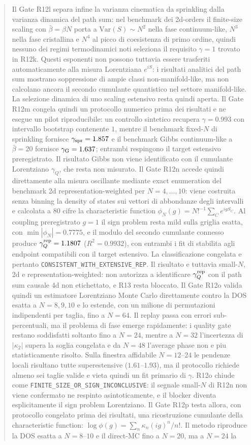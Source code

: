 \documentclass[11pt,a4paper]{article}
\begin{document}
\begin{abstract}
 Il Gate R12l separa infine la varianza cinematica da sprinkling dalla varianza dinamica del path sum: nel benchmark dei 2d-orders il finite-size scaling con $\bar\beta=\beta N$ porta a $\mathrm{Var}(S)\sim N^2$ nella fase continuum-like, $N^3$ nella fase cristallina e $N^4$ al picco di coesistenza di primo ordine, quindi nessuno dei regimi termodinamici noti seleziona il requisito $\gamma=1$ trovato in R12k. Questi esponenti non possono tuttavia essere trasferiti automaticamente alla misura Lorentziana $e^{iS}$: i risultati analitici del path sum mostrano soppressione di ampie classi non-manifold-like, ma non calcolano ancora il secondo cumulante quantistico nel settore manifold-like. La selezione dinamica di uno scaling estensivo resta quindi aperta. Il Gate R12m congela quindi un protocollo numerico prima dei risultati e ne esegue un pilot riproducibile: un controllo sintetico recupera $\gamma=0.993$ con intervallo bootstrap contenente $1$, mentre il benchmark fixed-$N$ di sprinkling fornisce $\gamma_{\rm spr}=1.857$ e il benchmark Gibbs continuum-like a $\bar\beta=20$ fornisce $\gamma_{\rm G}=1.637$; entrambi respingono il target estensivo preregistrato. Il risultato Gibbs non viene identificato con il cumulante Lorentziano $\gamma_Q$, che resta non misurato. Il Gate R12n accede quindi direttamente alla misura oscillante mediante exact enumeration del benchmark 2d representation-weighted per $N=4,\ldots,10$: viene costruita senza binning la density of states sui vettori di abbondanze degli intervalli e calcolata a 80 cifre la characteristic function $\phi_N(g)=N!^{-1}\sum_C e^{igS_C}$. Al coupling preregistrato $g=1$ il sign problem resta mild sulla griglia esatta, con $\min|\phi_N|=0.7775$, e il modulo del secondo cumulante connesso produce $\gamma_Q^{\rm rep}=1.1807$ ($R^2=0.9932$), con entrambi i fit di stabilita agli endpoint compatibili con il target estensivo. La classificazione congelata e pertanto \texttt{CONSISTENT\_WITH\_EXTENSIVE\_REP}. Il risultato e tuttavia small-$N$, 2d e representation-weighted: non autorizza a identificare $\gamma_Q^{\rm rep}$ con il path sum causale 4d non etichettato, e R13 resta bloccato. Il Gate R12o valida quindi un estimatore Lorentziano Monte Carlo direttamente contro la DOS esatta a $N=8,9,10$ e lo estende, con un milione di permutazioni indipendenti per taglia, fino a $N=64$. Il replay passa con errori sub-percentuali, ma il problema di fase emerge rapidamente: i quality gate restano soddisfatti soltanto fino a $N=24$, mentre a $N=32$ l'incertezza di $|\kappa_2|$ supera la soglia congelata e da $N=48$ l'average phase non e piu statisticamente risolto. Sulla finestra affidabile $N=12$--$24$ le pendenze locali risultano tutte superestensive ($1.61$--$1.93$), ma il protocollo richiede almeno sei taglie valide e vieta quindi un fit primario di $\gamma$. R12o chiude come \texttt{FINITE\_SIZE\_OR\_SIGN\_INCONCLUSIVE}: il segnale small-$N$ di R12n non viene confermato ne respinto asintoticamente, e il blocker diventa esplicitamente il sign problem Lorentziano. Il Gate R12p testa allora, con protocollo congelato prima dei risultati, una ricostruzione cumulante della characteristic function: $\log\phi(g)=\sum_n\kappa_n(ig)^n/n!$. Il metodo riproduce la DOS esatta a $N=8$--$10$ e il direct-MC fino a $N=20$, ma a $N=24$ la 
\end{abstract}
\end{document}
